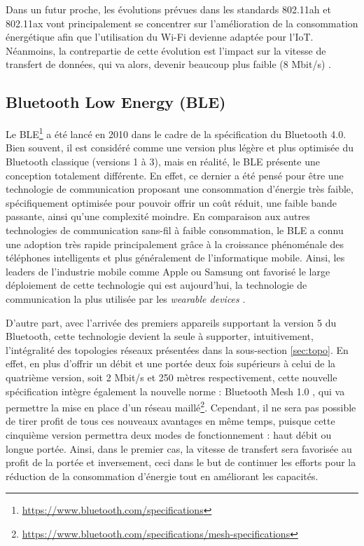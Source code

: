 Dans un futur proche, les évolutions prévues dans les standards 802.11ah et 802.11ax vont principalement se concentrer sur l'amélioration de la consommation énergétique afin que l'utilisation du Wi-Fi devienne adaptée pour l'\acs{IoT}. Néanmoins, la contrepartie de cette évolution est l'impact sur la vitesse de transfert de données, qui va alors, devenir beaucoup plus faible (8 Mbit/s) \citep{Sun2013}.

\subsection{Bluetooth Low Energy (\acs{BLE})}
\label{subec:com_ble}

Le \acs{BLE}\footnote{\url{https://www.bluetooth.com/specifications}} a été lancé en 2010 dans le cadre de la spécification du Bluetooth 4.0. Bien souvent, il est considéré comme une version plus légère et plus optimisée du Bluetooth classique (versions 1 à 3), mais en réalité, le \acs{BLE} présente une conception totalement différente. En effet, ce dernier a été pensé pour être une technologie de communication proposant une consommation d'énergie très faible, spécifiquement optimisée pour pouvoir offrir un coût réduit, une faible bande passante, ainsi qu'une complexité moindre. En comparaison aux autres technologies de communication sans-fil à faible consommation, le \acs{BLE} a connu une adoption très rapide principalement grâce à la croissance phénoménale des téléphones intelligents et plus généralement de l'informatique mobile. Ainsi, les leaders de l’industrie mobile comme Apple ou Samsung ont favorisé le large déploiement de cette technologie qui est aujourd'hui, la technologie de communication la plus utilisée par les \textit{wearable devices} \citep{Gomez2012}.

D'autre part, avec l'arrivée des premiers appareils supportant la version 5 du Bluetooth, cette technologie devient la seule à supporter, intuitivement, l'intégralité des topologies réseaux présentées dans la sous-section \ref{sec:topo}. En effet, en plus d'offrir un débit et une portée deux fois supérieurs à celui de la quatrième version, soit 2 Mbit/s et 250 mètres respectivement, cette nouvelle spécification intègre également la nouvelle norme : \og Bluetooth Mesh 1.0 \fg, qui va permettre la mise en place d'un réseau maillé\footnote{\url{https://www.bluetooth.com/specifications/mesh-specifications}}. Cependant, il ne sera pas possible de tirer profit de tous ces nouveaux avantages en même temps, puisque cette cinquième version permettra deux modes de fonctionnement : haut débit ou longue portée. Ainsi, dans le premier cas, la vitesse de transfert sera favorisée au profit de la portée et inversement, ceci dans le but de continuer les efforts pour la réduction de la consommation d'énergie tout en améliorant les capacités.

